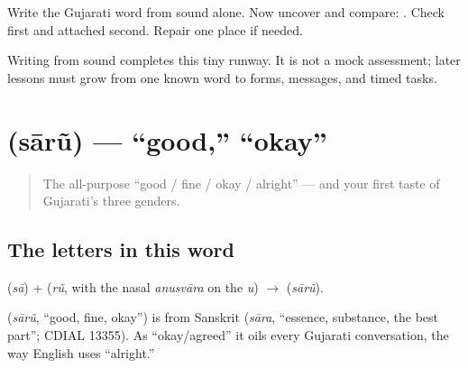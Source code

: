 Write the Gujarati word from sound alone. Now uncover and compare: \textbf{}. Check \textbf{} first and attached \textbf{} second. Repair one place if needed.

\begin{tcolorbox}[breakable,colback=teal!4,colframe=teal!35!black,title={Before you move on}]
Writing from sound completes this tiny runway. It is not a mock assessment; later lessons must grow from one known word to forms, messages, and timed tasks.
\end{tcolorbox}
\section[\texorpdfstring{\gu{સારું} (sārũ)}{સારું (sārũ)}]{ (sārũ) — \textquotedblleft{}good,\textquotedblright{} \textquotedblleft{}okay\textquotedblright{}}

\label{lesson:GU-C01-saarun}



\begin{quote}
The all-purpose \textquotedblleft{}good / fine / okay / alright\textquotedblright{} — and your first taste of Gujarati's three genders.
\end{quote}

\subsection*{The letters in this word}
\textbf{} (\emph{sā}) + \textbf{} (\emph{rũ}, with the nasal \emph{anusvāra} on the \emph{u}) $\to$ \textbf{} (\emph{sārũ}).

\begin{cousinweb}
\textbf{} (\emph{sārũ}, \textquotedblleft{}good, fine, okay\textquotedblright{}) is from Sanskrit \textbf{} (\emph{sāra}, \textquotedblleft{}essence, substance, the best part\textquotedblright{}; CDIAL 13355). As \textquotedblleft{}okay/agreed\textquotedblright{} it oils every Gujarati conversation, the way English uses \textquotedblleft{}alright.\textquotedblright{}
\end{cousinweb}

